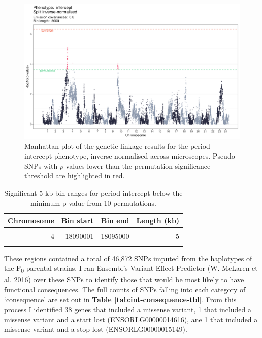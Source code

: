 \documentclass[
]{book}
\begin{document}
\begin{figure}
\includegraphics[width=1\linewidth]{figs/somites/manhattan_intercept} \caption{Manhattan plot of the genetic linkage results for the period intercept phenotype, inverse-normalised across microscopes. Pseudo-SNPs with \(p\)-values lower than the permutation significance threshold are highlighted in red.}\label{fig:somite-manhattan}
\end{figure}

\begin{table}

\caption{\label{tab:somite-sig-int-tbl}Significant 5-kb bin ranges for period intercept below the minimum p-value from 10 permutations.}
\centering
\begin{tabular}[t]{rrrr}
\toprule
Chromosome & Bin start & Bin end & Length (kb)\\
\midrule
\cellcolor{gray!6}{3} & \cellcolor{gray!6}{31880001} & \cellcolor{gray!6}{35420000} & \cellcolor{gray!6}{3540}\\
4 & 18090001 & 18095000 & 5\\
\cellcolor{gray!6}{10} & \cellcolor{gray!6}{2995001} & \cellcolor{gray!6}{3690000} & \cellcolor{gray!6}{695}\\
\bottomrule
\end{tabular}
\end{table}

These regions contained a total of 46,872 SNPs imputed from the haplotypes of the F\textsubscript{0} parental strains.
I ran Ensembl's Variant Effect Predictor (W. McLaren et al. 2016) over these SNPs to identify those that would be most likely to have functional consequences. The full counts of SNPs falling into each category of `consequence' are set out in \textbf{Table \ref{tab:int-consequence-tbl}}. From this process I identified 38 genes that included a missense variant, 1 that included a missense variant and a start lost (ENSORLG00000014616), ane 1 that included a missense variant and a stop lost (ENSORLG00000015149).
\end{document}
